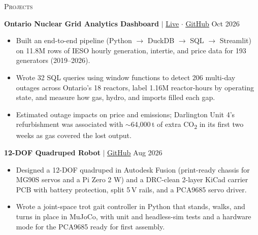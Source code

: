 \documentclass[a4paper]{article}
\newcommand{\lineunder} {
    \par\vspace*{-2pt}
    \noindent\hrulefill
    \par\vspace*{2pt}
}
\newcommand{\header}[1]{
    \vspace*{3pt}
    {\large\textsc{#1}}
    \lineunder
}
\begin{document}
\vspace{1.5mm}
\fi

\header{Projects}
\vspace{1.5mm}

\textbf{Ontario Nuclear Grid Analytics Dashboard} $|$
\href{https://nuclear-dashboard.streamlit.app}{\underline{Live}} $\cdot$
\href{https://github.com/danielzhang122/ontario-nuclear-dashboard}{\underline{GitHub}}
\hfill Oct 2026
\vspace{1mm}
\vspace{1mm}
\begin{itemize}
    \item Built an end-to-end pipeline (Python $\rightarrow$ DuckDB $\rightarrow$ SQL $\rightarrow$ Streamlit) on 11.8M rows of IESO hourly generation, intertie, and price data for 193 generators (2019--2026).
    \item Wrote 32 SQL queries using window functions to detect 206 multi-day outages across Ontario's 18 reactors, label 1.16M reactor-hours by operating state, and measure how gas, hydro, and imports filled each gap.
    \item Estimated outage impacts on price and emissions; Darlington Unit 4's refurbishment was associated with $\sim$64,000\,t of extra CO\textsubscript{2} in its first two weeks as gas covered the lost output.
\end{itemize}
\vspace{1.5mm}

\textbf{12-DOF Quadruped Robot} $|$
\href{https://github.com/danielzhang122/quadruped-robot}{\underline{GitHub}}
\hfill Aug 2026
\vspace{1mm}
\begin{itemize}
    \item Designed a 12-DOF quadruped in Autodesk Fusion (print-ready chassis for MG90S servos and a Pi Zero 2 W) and a \mbox{DRC-clean} 2-layer KiCad carrier PCB with battery protection, split 5\,V rails, and a PCA9685 servo driver.
    \item Wrote a joint-space trot gait controller in Python that stands, walks, and turns in place in MuJoCo, with unit and headless-sim tests and a hardware mode for the PCA9685 ready for first assembly.
\end{itemize}
\vspace{1.5mm}
\end{document}
